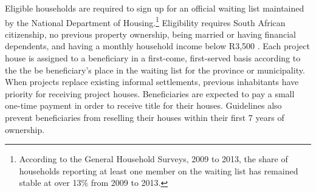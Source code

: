 \documentclass[12pt]{article}
\begin{document}









Eligible households are required to sign up for an official waiting list maintained by the National Department of Housing.\footnote{According to the General Household Surveys, 2009 to 2013, the share of households reporting at least one member on the waiting list has remained stable at over 13\% from 2009 to 2013.}  Eligibility requires South African citizenship, no previous property ownership, being married or having financial dependents, and having a monthly household income below R3,500 \citep{seriq}.  Each project house is assigned to a beneficiary in a first-come, first-served basis according to the the be beneficiary's place in the waiting list for the province or municipality. When projects replace existing informal settlements, previous inhabitants have priority for receiving project houses.  Beneficiaries are expected to pay a small one-time payment in order to receive title for their houses.  Guidelines also prevent beneficiaries from reselling their houses within their first 7 years of ownership.   %
\end{document}
